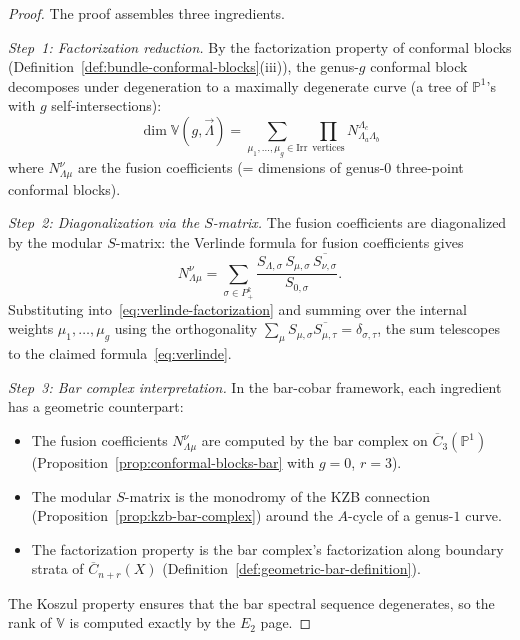 \begin{proof}
The proof assembles three ingredients.

\emph{Step~1: Factorization reduction.}
By the factorization property of conformal blocks
(Definition~\ref{def:bundle-conformal-blocks}(iii)), the
genus-$g$ conformal block decomposes under degeneration to a
maximally degenerate curve (a tree of $\mathbb{P}^1$'s with
$g$ self-intersections):
\begin{equation}\label{eq:verlinde-factorization}
\dim \mathbb{V}(g, \vec{\Lambda})
= \sum_{\mu_1, \ldots, \mu_g \in \mathrm{Irr}}
\prod_{\text{vertices}} N_{\Lambda_a \Lambda_b}^{\Lambda_c}
\end{equation}
where $N_{\Lambda \mu}^{\nu}$ are the fusion coefficients
(= dimensions of genus-$0$ three-point conformal blocks).

\emph{Step~2: Diagonalization via the $S$-matrix.}
The fusion coefficients are diagonalized by the modular
$S$-matrix: the Verlinde formula for fusion coefficients gives
\[
N_{\Lambda\mu}^{\nu}
= \sum_{\sigma \in P_+^k}
\frac{S_{\Lambda,\sigma}\, S_{\mu,\sigma}\,
\overline{S_{\nu,\sigma}}}{S_{0,\sigma}}.
\]
Substituting into~\eqref{eq:verlinde-factorization} and summing
over the internal weights $\mu_1, \ldots, \mu_g$ using the
orthogonality $\sum_\mu S_{\mu,\sigma} \overline{S_{\mu,\tau}}
= \delta_{\sigma,\tau}$, the sum telescopes to the claimed
formula~\eqref{eq:verlinde}.

\emph{Step~3: Bar complex interpretation.}
In the bar-cobar framework, each ingredient has a geometric
counterpart:
\begin{itemize}
\item The fusion coefficients $N_{\Lambda\mu}^{\nu}$ are computed
  by the bar complex on $\overline{C}_3(\mathbb{P}^1)$
  (Proposition~\ref{prop:conformal-blocks-bar} with $g = 0$,
  $r = 3$).
\item The modular $S$-matrix is the monodromy of the KZB connection
  (Proposition~\ref{prop:kzb-bar-complex}) around the $A$-cycle
  of a genus-$1$ curve.
\item The factorization property is the bar complex's
  factorization along boundary strata of $\overline{C}_{n+r}(X)$
  (Definition~\ref{def:geometric-bar-definition}).
\end{itemize}
The Koszul property ensures that the bar spectral sequence
degenerates, so the rank of $\mathbb{V}$ is computed exactly by
the $E_2$ page.
\end{proof}

